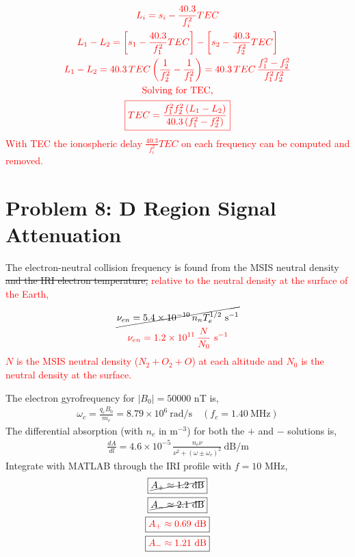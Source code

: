 \documentclass[11pt]{article}
\begin{document}
\begin{gather*}
\textcolor{red}{L_i = s_i - \frac{40.3}{f_i^2}TEC} \\
\textcolor{red}{L_1 - L_2 = \left[s_1 - \frac{40.3}{f_1^2}TEC\right] - \left[s_2 - \frac{40.3}{f_2^2}TEC\right]} \\
\textcolor{red}{L_1 - L_2 = 40.3\,TEC\left(\frac{1}{f_2^2} - \frac{1}{f_1^2}\right) = 40.3\,TEC\,\frac{f_1^2 - f_2^2}{f_1^2 f_2^2}} \\
\textcolor{red}{\text{Solving for TEC,}} \\
\textcolor{red}{\boxed{TEC = \frac{f_1^2 f_2^2 \left(L_1 - L_2\right)}{40.3\left(f_1^2 - f_2^2\right)}}}
\end{gather*}
\hspace*{2em}\textcolor{red}{With TEC the ionospheric delay
$\frac{40.3}{f_i^2}TEC$ on each frequency can be computed and removed.}

\newpage
\section*{Problem 8: D Region Signal Attenuation}
\hspace*{2em}The electron-neutral collision frequency is found from the MSIS neutral density \sout{and the IRI electron temperature,}
\textcolor{red}{relative to the neutral density at the surface of the Earth,}
\begin{gather*}
\cancel{\nu_{en} = 5.4\times10^{-10}\, n_n T_e^{1/2}~\mathrm{s^{-1}}} \\
\textcolor{red}{\nu_{en} = 1.2\times10^{11}\,\frac{N}{N_0}~\mathrm{s^{-1}}}
\end{gather*}
\hspace*{2em}\textcolor{red}{$N$ is the MSIS neutral density ($N_2 + O_2 + O$) at each altitude and $N_0$ is the neutral density at the surface.}

\hspace*{2em}The electron gyrofrequency for $|B_0| = 50000$ nT is,
\begin{gather*}
\omega_c = \frac{q_e B_0}{m_e} = 8.79\times10^{6}~\mathrm{rad/s} \quad (f_c = 1.40~\mathrm{MHz})
\end{gather*}
\hspace*{2em}The differential absorption (with $n_e$ in m$^{-3}$) for both the $+$ and $-$ solutions is,
\begin{gather*}
\frac{dA}{dl} = 4.6\times10^{-5}\,\frac{n_e \nu}{\nu^2 + (\omega \pm \omega_c)^2}~\mathrm{dB/m}
\end{gather*}
\hspace*{2em}Integrate with MATLAB through the IRI profile with $f = 10$ MHz,
\begin{gather*}
\boxed{\cancel{A_{+} \approx 1.2~\mathrm{dB}}} \\
\boxed{\cancel{A_{-} \approx 2.1~\mathrm{dB}}} \\
\boxed{\textcolor{red}{A_{+} \approx 0.69~\mathrm{dB}}} \\
\boxed{\textcolor{red}{A_{-} \approx 1.21~\mathrm{dB}}}
\end{gather*}
\end{document}
